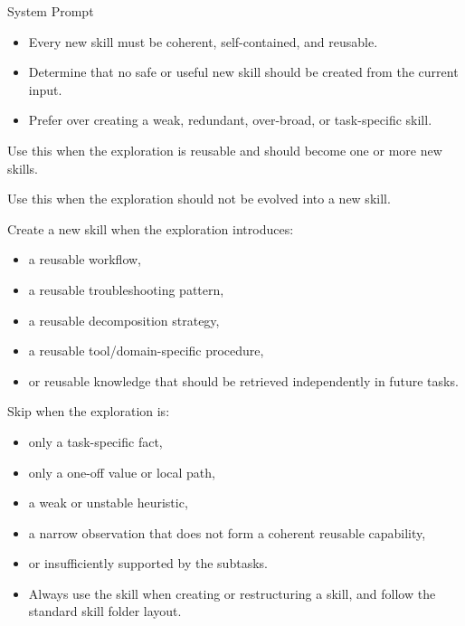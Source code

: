 \begin{svpromptbox}{System Prompt}
\begin{itemize}
\item Every new skill must be coherent, self-contained, and reusable.
\end{itemize}
\smallskip
{}
\begin{itemize}
\item Determine that no safe or useful new skill should be created from the current input.
\item Prefer  over creating a weak, redundant, over-broad, or task-specific skill.
\end{itemize}
\smallskip
{}
\smallskip
{}
Use this when the exploration is reusable and should become one or more new skills.\par
\smallskip
{}
Use this when the exploration should not be evolved into a new skill.\par
\smallskip
{}
\smallskip
{}
\smallskip
Create a new skill when the exploration introduces:\par
\smallskip
\begin{itemize}
\item a reusable workflow,
\item a reusable troubleshooting pattern,
\item a reusable decomposition strategy,
\item a reusable tool/domain-specific procedure,
\item or reusable knowledge that should be retrieved independently in future tasks.
\end{itemize}
\smallskip
Skip when the exploration is:\par
\begin{itemize}
\item only a task-specific fact,
\item only a one-off value or local path,
\item a weak or unstable heuristic,
\item a narrow observation that does not form a coherent reusable capability,
\item or insufficiently supported by the subtasks.
\end{itemize}
\smallskip
{}
\begin{itemize}
\item Always use the  skill when creating or restructuring a skill, and follow the standard skill folder layout.

\end{itemize}
\end{svpromptbox}
